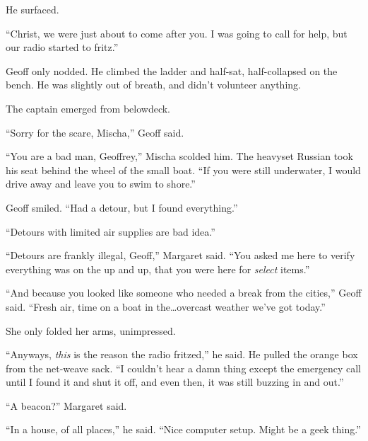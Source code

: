 \blacksquare



He surfaced.



``Christ, we were just about to come after you.  I was going to call for help, but our radio started to fritz.''



Geoff only nodded.  He climbed the ladder and half-sat, half-collapsed on the bench.  He was slightly out of breath, and didn't volunteer anything.



The captain emerged from belowdeck.



``Sorry for the scare, Mischa,'' Geoff said.



``You are a bad man, Geoffrey,'' Mischa scolded him.  The heavyset Russian took his seat behind the wheel of the small boat.  ``If you were still underwater, I would drive away and leave you to swim to shore.''



Geoff smiled.  ``Had a detour, but I found everything.''



``Detours with limited air supplies are bad idea.''



``Detours are frankly illegal, Geoff,'' Margaret said.  ``You asked me here to verify everything was on the up and up, that you were here for \emph{select} items.''



``And because you looked like someone who needed a break from the cities,'' Geoff said.  ``Fresh air, time on a boat in the\ldots overcast weather we've got today.''



She only folded her arms, unimpressed.



``Anyways, \emph{this} is the reason the radio fritzed,'' he said.  He pulled the orange box from the net-weave sack.  ``I couldn't hear a damn thing except the emergency call until I found it and shut it off, and even then, it was still buzzing in and out.''



``A beacon?''  Margaret said.



``In a house, of all places,'' he said.  ``Nice computer setup.  Might be a geek thing.''



